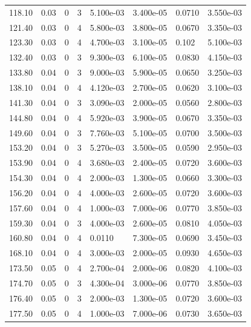 \documentclass[preview]{standalone}
\begin{document}
{{{\begin{tabular}{L{1.2cm}C{1.2cm} C{0.3cm}C{0.5cm} C{1.4cm}C{1.4cm} C{1.4cm}C{1.4cm}}
  118.10  &  0.03  & 0     &  3 &  5.100e-03  & 3.400e-05  & 0.0710 &  3.550e-03   \\ 
  121.40  &  0.03  & 0     &  4 &  5.800e-03  & 3.800e-05  & 0.0670 &  3.350e-03   \\ 
  123.30  &  0.03  & 0     &  4 &  4.700e-03  & 3.100e-05  & 0.102 &  5.100e-03   \\ 
  132.40  &  0.03  & 0     &  3 &  9.300e-03  & 6.100e-05  & 0.0830 &  4.150e-03   \\ 
  133.80  &  0.04  & 0     &  3 &  9.000e-03  & 5.900e-05  & 0.0650 &  3.250e-03   \\ 
  138.10  &  0.04  & 0     &  4 &  4.120e-03  & 2.700e-05  & 0.0620 &  3.100e-03   \\ 
  141.30  &  0.04  & 0     &  3 &  3.090e-03  & 2.000e-05  & 0.0560 &  2.800e-03   \\ 
  144.80  &  0.04  & 0     &  4 &  5.920e-03  & 3.900e-05  & 0.0670 &  3.350e-03   \\ 
  149.60  &  0.04  & 0     &  3 &  7.760e-03  & 5.100e-05  & 0.0700 &  3.500e-03   \\ 
  153.20  &  0.04  & 0     &  3 &  5.270e-03  & 3.500e-05  & 0.0590 &  2.950e-03   \\ 
  153.90  &  0.04  & 0     &  4 &  3.680e-03  & 2.400e-05  & 0.0720 &  3.600e-03   \\ 
  154.30  &  0.04  & 0     &  4 &  2.000e-03  & 1.300e-05  & 0.0660 &  3.300e-03   \\ 
  156.20  &  0.04  & 0     &  4 &  4.000e-03  & 2.600e-05  & 0.0720 &  3.600e-03   \\ 
  157.60  &  0.04  & 0     &  4 &  1.000e-03  & 7.000e-06  & 0.0770 &  3.850e-03   \\ 
  159.30  &  0.04  & 0     &  3 &  4.000e-03  & 2.600e-05  & 0.0810 &  4.050e-03   \\ 
  160.80  &  0.04  & 0     &  4 &  0.0110  & 7.300e-05  & 0.0690 &  3.450e-03   \\ 
  168.10  &  0.04  & 0     &  4 &  3.000e-03  & 2.000e-05  & 0.0930 &  4.650e-03   \\ 
  173.50  &  0.05  & 0     &  4 &  2.700e-04  & 2.000e-06  & 0.0820 &  4.100e-03   \\ 
  174.70  &  0.05  & 0     &  3 &  4.300e-04  & 3.000e-06  & 0.0770 &  3.850e-03   \\ 
  176.40  &  0.05  & 0     &  3 &  2.000e-03  & 1.300e-05  & 0.0720 &  3.600e-03   \\ 
  177.50  &  0.05  & 0     &  4 &  1.000e-03  & 7.000e-06  & 0.0730 &  3.650e-03   \\ 

\end{tabular}}}}
\end{document}
